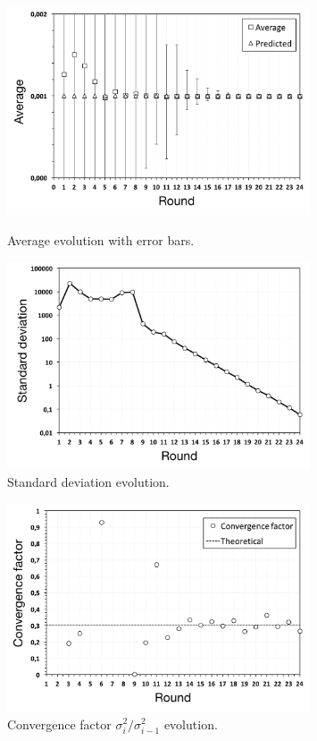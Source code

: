 \begin{figure}[p]
\centering
\includegraphics[keepaspectratio=true, width=0.8\textwidth]{images/counting_average}
\caption{Average evolution with error bars.}
\label{fig:counting_average}
\includegraphics[keepaspectratio=true, width=0.8\textwidth]{images/counting_standard_deviation}
\caption{Standard deviation evolution.}
\label{fig:counting_standard_deviation}
\end{figure}


\begin{figure}[ht]
  \centering
  \includegraphics[keepaspectratio=true, width=0.8\textwidth]{images/counting_conv_factor}\caption{Convergence factor $\sigma_i^2 / \sigma_{i-1}^2$ evolution.}
  \label{fig:counting_conv_factor}
\end{figure}

